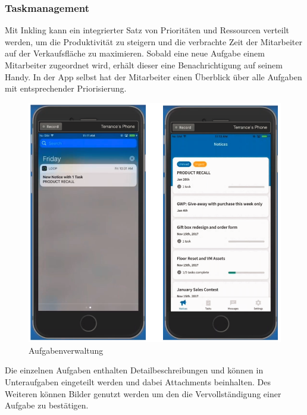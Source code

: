 \subsubsection{Taskmanagement}

Mit Inkling kann ein integrierter Satz von Prioritäten und Ressourcen verteilt werden, um die Produktivität zu steigern und die verbrachte Zeit der Mitarbeiter auf der Verkaufsfläche zu maximieren. Sobald eine neue Aufgabe einem Mitarbeiter zugeordnet wird, erhält dieser eine Benachrichtigung auf seinem Handy. In der App selbst hat der Mitarbeiter einen Überblick über alle Aufgaben mit entsprechender Priorisierung.

\begin{figure}[H] 
\centering 
\includegraphics[scale=0.72]{images/inktasks} 
\caption[Aufgabenverwaltung]{Aufgabenverwaltung\protect} 
\label{ws} 
\end{figure}

Die einzelnen Aufgaben enthalten Detailbeschreibungen und können in Unteraufgaben eingeteilt werden und dabei Attachments beinhalten. Des Weiteren können Bilder genutzt werden um den die Vervollständigung einer Aufgabe zu bestätigen.

